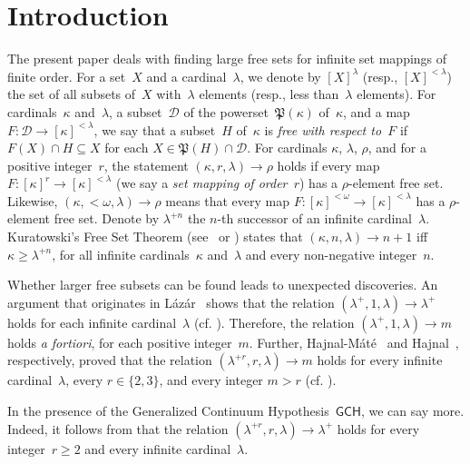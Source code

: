 \documentclass[psamsfonts,reqno]{amsart}
\theoremstyle{plain}
\theoremstyle{definition}
\theoremstyle{remark}
\numberwithin{equation}{section}
\numberwithin{figure}{section}
\newcommand{\gk}{\kappa}
\newcommand{\gl}{\lambda}
\newcommand{\gr}{\rho}
\newcommand{\go}{\omega}
\newcommand{\Pow}{\mathfrak{P}}
\newcommand{\cD}{\mathcal{D}}
\newcommand{\set}[1]{\{#1\}}
\begin{document}
\maketitle


\section{Introduction}\label{S:Intro}
The present paper deals with finding large free sets for infinite set mappings of finite order. For a set~$X$ and a cardinal~$\gl$, we denote by $[X]^\gl$ (resp., $[X]^{<\gl}$) the set of all subsets of~$X$ with~$\gl$ elements (resp., less than~$\gl$ elements). For cardinals~$\gk$ and~$\gl$, a subset~$\cD$ of the powerset~$\Pow(\gk)$ of~$\gk$, and a map $F\colon\cD\to[\gk]^{<\gl}$, we say that a subset~$H$ of~$\gk$ is \emph{free with respect to~$F$} if $F(X)\cap H\subseteq X$ for each $X\in\Pow(H)\cap\cD$. For cardinals $\gk$, $\gl$, $\gr$, and for a positive integer~$r$, the statement $(\gk,r,\gl)\to\gr$ holds if every map $F\colon[\gk]^r\to[\gk]^{<\gl}$ (we say a \emph{set mapping of order~$r$}) has a $\gr$-element free set. Likewise, $(\gk,{<}\go,\gl)\to\gr$ means that every map $F\colon[\gk]^{<\go}\to[\gk]^{<\gl}$ has a $\gr$-element free set. Denote by $\gl^{+n}$ the $n$-th successor of an infinite cardinal~$\gl$. Kuratowski's Free Set Theorem (see~\cite{Kura51} or \cite[Theorem~46.1]{EHMR}) states that $(\gk,n,\gl)\to n+1$ if{f} $\gk\geq\gl^{+n}$, for all infinite cardinals~$\gk$ and~$\gl$ and every non-negative integer~$n$.

Whether larger free subsets can be found leads to unexpected discoveries. An argument that originates in L\'az\'ar~\cite{Laza36} shows that the relation $(\gl^+,1,\gl)\rightarrow\gl^+$ holds for each infinite cardinal~$\gl$ (cf. \cite[Corollary~44.2]{EHMR}). Therefore, the relation $(\gl^+,1,\gl)\rightarrow m$ holds \emph{a fortiori}, for each positive integer~$m$. Further, Hajnal-M\'at\'e~\cite{HaMa75} and Hajnal~\cite{EHMR}, respectively, proved that the relation $(\gl^{+r},r,\gl)\to m$ holds for every infinite cardinal~$\gl$, every $r\in\set{2,3}$, and every integer $m>r$ (cf. \cite[Theorem~46.2]{EHMR}).

In the presence of the Generalized Continuum Hypothesis~$\mathsf{GCH}$, we can say more. Indeed, it follows from \cite[Theorem~45.5]{EHMR} that the relation $(\gl^{+r},r,\gl)\to\gl^+$ holds for every integer~$r\geq2$ and every infinite cardinal~$\gl$.
\end{document}
